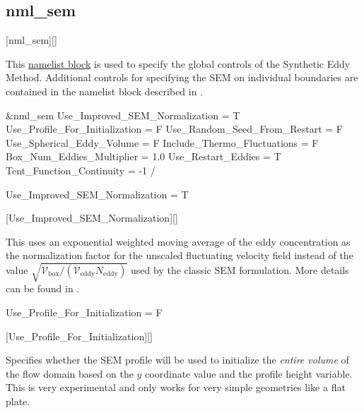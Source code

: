 \subsection{nml\_sem}
\label{SEC:nml_sem}
\inp*[nmlSEM]{}[nml\_sem][]

This \hyperref[SEC:User_Input]{namelist block}
is used to specify the global controls of the Synthetic Eddy Method.
%
Additional controls for specifying the SEM on individual boundaries
are contained in the  namelist block
described in .

\begin{nmlblocklst}[
,label={LST:nml_sem}
,caption={Namelist nml\_sem.}
]
&nml_sem
  Use_Improved_SEM_Normalization = T
  Use_Profile_For_Initialization = F
  Use_Random_Seed_From_Restart   = F
  Use_Spherical_Eddy_Volume      = F
  Include_Thermo_Fluctuations    = F
  Box_Num_Eddies_Multiplier      = 1.0
  Use_Restart_Eddies             = T
  Tent_Function_Continuity       = -1
/
\end{nmlblocklst}


\begin{nmldescitem}
Use_Improved_SEM_Normalization = T
\end{nmldescitem}
[Use\_Improved\_SEM\_Normalization][]

\begin{nmldescbody}
This uses an exponential weighted moving average of the eddy concentration as
the normalization factor for the unscaled fluctuating velocity field instead of
the value $\sqrt{\mathscr{V}_{\mathrm{box}} / \left(\mathscr{V}_{\mathrm{eddy}}
N_{\mathrm{eddy}}\right)}$ used by the classic SEM formulation.
%
More details can be found in .
\end{nmldescbody}


\begin{nmldescitem}
Use_Profile_For_Initialization = F
\end{nmldescitem}
[Use\_Profile\_For\_Initialization][]

\begin{nmldescbody}
Specifies whether the SEM profile will be used to initialize the
\emph{entire volume} of the flow domain based on
the $y$ coordinate value and the profile height variable.
%
This is very experimental and only works for very simple geometries
like a flat plate.


\end{nmldescbody}

